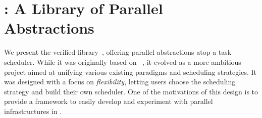 

\section{\Parabs: A Library of Parallel Abstractions}
\label{sec:parabs}

We present the verified \Parabs library~, offering parallel abstractions atop a task scheduler.
While it was originally based on \Domainslib~\citep{domainslib}, it evolved as a more ambitious project aimed at unifying various existing paradigms and scheduling strategies.
It was designed with a focus on \emph{flexibility}, letting users choose the scheduling strategy and build their own scheduler.
One of the motivations of this design is to provide a framework to easily develop and experiment with parallel infrastructures in \OCamlFive.















%
